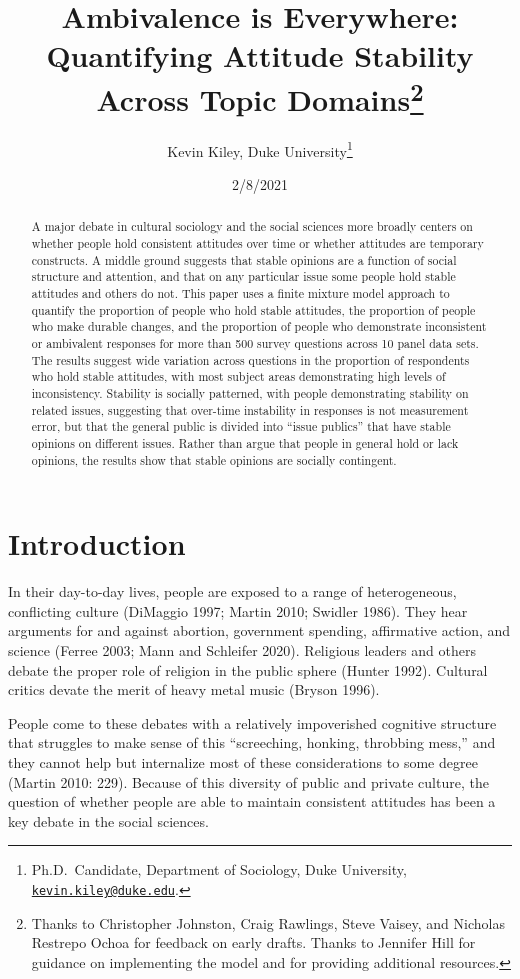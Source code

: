 \documentclass[12pt,]{article}
\title{Ambivalence is Everywhere: Quantifying Attitude Stability Across Topic Domains\footnote{Thanks to Christopher Johnston, Craig Rawlings, Steve Vaisey, and Nicholas Restrepo Ochoa for feedback on early drafts. Thanks to Jennifer Hill for guidance on implementing the model and for providing additional resources.}}
\author{Kevin Kiley, Duke University\footnote{Ph.D.~Candidate, Department of Sociology, Duke University, \href{mailto:kevin.kiley@duke.edu}{\nolinkurl{kevin.kiley@duke.edu}}.}}
\date{2/8/2021}
\begin{document}
\maketitle
\begin{abstract}
A major debate in cultural sociology and the social sciences more broadly centers on whether people hold consistent attitudes over time or whether attitudes are temporary constructs. A middle ground suggests that stable opinions are a function of social structure and attention, and that on any particular issue some people hold stable attitudes and others do not. This paper uses a finite mixture model approach to quantify the proportion of people who hold stable attitudes, the proportion of people who make durable changes, and the proportion of people who demonstrate inconsistent or ambivalent responses for more than 500 survey questions across 10 panel data sets. The results suggest wide variation across questions in the proportion of respondents who hold stable attitudes, with most subject areas demonstrating high levels of inconsistency. Stability is socially patterned, with people demonstrating stability on related issues, suggesting that over-time instability in responses is not measurement error, but that the general public is divided into ``issue publics'' that have stable opinions on different issues. Rather than argue that people in general hold or lack opinions, the results show that stable opinions are socially contingent.
\end{abstract}

\doublespacing

\hypertarget{introduction}{%
\section{Introduction}\label{introduction}}

In their day-to-day lives, people are exposed to a range of heterogeneous, conflicting culture (DiMaggio 1997; Martin 2010; Swidler 1986). They hear arguments for and against abortion, government spending, affirmative action, and science (Ferree 2003; Mann and Schleifer 2020). Religious leaders and others debate the proper role of religion in the public sphere (Hunter 1992). Cultural critics devate the merit of heavy metal music (Bryson 1996).

People come to these debates with a relatively impoverished cognitive structure that struggles to make sense of this ``screeching, honking, throbbing mess,'' and they cannot help but internalize most of these considerations to some degree (Martin 2010: 229). Because of this diversity of public and private culture, the question of whether people are able to maintain consistent attitudes has been a key debate in the social sciences.
\end{document}
